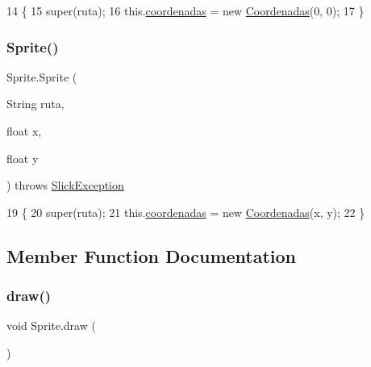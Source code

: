 \begin{DoxyCode}
14                                                     \{
15         super(ruta);
16         this.\mbox{\hyperlink{class_sprite_ada651b6921cee54a619e11c4eb01526d}{coordenadas}} = \textcolor{keyword}{new} \mbox{\hyperlink{class_coordenadas}{Coordenadas}}(0, 0);
17     \}
\end{DoxyCode}
\mbox{\label{class_sprite_a0a53bf04225c024f0499c8c2bd092b5d}} 
\subsubsection{\texorpdfstring{Sprite()}{Sprite()}\hspace{0.1cm}{\footnotesize\ttfamily [3/3]}}
{\footnotesize\ttfamily Sprite.\+Sprite (\begin{DoxyParamCaption}\item[{String}]{ruta,  }\item[{float}]{x,  }\item[{float}]{y }\end{DoxyParamCaption}) throws \mbox{\hyperlink{classorg_1_1newdawn_1_1slick_1_1_slick_exception}{Slick\+Exception}}\hspace{0.3cm}{\ttfamily [inline]}}


\begin{DoxyCode}
19                                                                       \{
20         super(ruta);
21         this.\mbox{\hyperlink{class_sprite_ada651b6921cee54a619e11c4eb01526d}{coordenadas}} = \textcolor{keyword}{new} \mbox{\hyperlink{class_coordenadas}{Coordenadas}}(x, y);
22     \}
\end{DoxyCode}


\subsection{Member Function Documentation}
\mbox{\label{class_sprite_a0d3088cb4ee83eb438a48bb47351fe8e}} 
\subsubsection{\texorpdfstring{draw()}{draw()}}
{\footnotesize\ttfamily void Sprite.\+draw (\begin{DoxyParamCaption}{ }\end{DoxyParamCaption})\hspace{0.3cm}{\ttfamily [inline]}}


